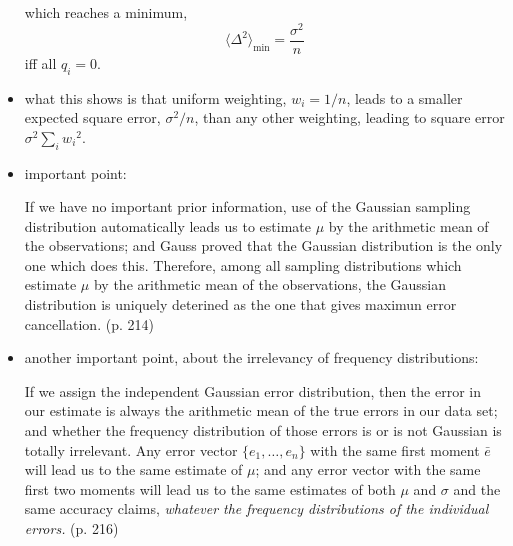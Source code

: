 \documentclass[../jaynes_prob_theory_notes.tex]{subfiles}
\begin{document}
\begin{itemize}
\begin{equation*}
                        \end{equation*}
                        which reaches a minimum,
                        \begin{equation*}
                            {\langle {\Delta}^2 \rangle}_{\min} = \frac{{\sigma}^2}{n}
                        \end{equation*}
                        iff all $q_i = 0$.
                    \item what this shows is that uniform weighting, $w_i = 1/n$, leads to a smaller expected square error, ${\sigma}^2/n$, than any other weighting, leading to square error ${\sigma}^2 \sum_{i} {w_i}^2$.
                    \item important point:
                        \begin{displayquote}
                            If we have no important prior information, use of the Gaussian sampling distribution automatically leads us to estimate $\mu$ by the arithmetic mean of the observations; and Gauss proved that the Gaussian distribution is the only one which does this. Therefore, among all sampling distributions which estimate $\mu$ by the arithmetic mean of the observations, the Gaussian distribution is uniquely deterined as the one that gives maximun error cancellation. (p. 214)
                        \end{displayquote}
                    \item another important point, about the irrelevancy of frequency distributions:
                        \begin{displayquote}
                            If we assign the independent Gaussian error distribution, then the error in our estimate is always the arithmetic mean of the true errors in our data set; and whether the frequency distribution of those errors is or is not Gaussian is totally irrelevant. Any error vector $\{e_1, \ldots, e_n \}$ with the same first moment $\bar{e}$ will lead us to the same estimate of $\mu$; and any error vector with the same first two moments will lead us to the same estimates of both $\mu$ and $\sigma$ and the same accuracy claims, \textit{whatever the frequency distributions of the individual errors.} (p. 216)
                        \end{displayquote}
                \end{itemize}
\end{document}
